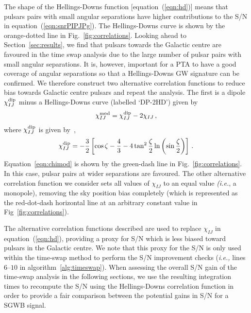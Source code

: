 \documentclass[fleqn,usenatbib]{mnras}
\newcommand{\chiIJhd}{\chi_{IJ}}
\newcommand{\chiIJdip}{\chi_{IJ}^{\rm dip}}
\begin{document}
The shape of the Hellings-Downs function [equation~(\ref{eqn:hd})] means that pulsars pairs with small angular separations have higher contributions to the S/N in equation~(\ref{eqn:snrPIPJPg}). 
The Hellings-Downs curve is shown by the orange-dotted line in Fig.~\ref{fig:correlations}.
Looking ahead to Section~\ref{sec:results}, we find that pulsars towards the Galactic centre are favoured in the time swap analysis due to the large number of pulsar pairs with small angular separations.
It is, however, important for a PTA to have a good coverage of angular separations so that a Hellings-Downs GW signature can be confirmed. 
We therefore construct two alternative correlation functions to reduce bias towards Galactic centre pulsars and repeat the analysis.
The first is a dipole $\chiIJdip$ minus a Hellings-Downs curve (labelled `DP-2HD') given by
\begin{equation}
\chi_{IJ}^{\rm mod} = \chiIJdip - 2 \chiIJhd\,,
\label{eqn:chimod}
\end{equation}
where $\chiIJdip$ is given by~\citep{AnholmEtAl:2009},
\begin{equation}
\chiIJdip = -\frac{3}{2}
            \left[ \cos \zeta - \frac{4}{3} - 4 \tan^2 \frac{\zeta}{2} 
                   \ln \left( \sin \frac{\zeta}{2} \right) \right]\,.
\label{eqn:dip}
\end{equation}
Equation~\ref{eqn:chimod} is shown by the green-dash line in Fig.~\ref{fig:correlations}. 
In this case, pulsar pairs at wider separations are favoured.
The other alternative correlation function we consider sets all values of $\chiIJhd$ to an equal value \emph{(i.e.}, a monopole), removing the sky position bias completely (which is represented as the red-dot-dash horizontal line at an arbitrary constant value in Fig~\ref{fig:correlations}). 

The alternative correlation functions described are used to replace $\chi_{IJ}$ in equation~(\ref{eqn:hd}), providing a proxy for S/N which is less biased toward pulsars in the Galactic centre. 
We note that this proxy for the S/N is only used within the time-swap method to perform the S/N improvement checks (\emph{i.e.,} lines $6$--$10$ in algorithm~\ref{alg:timeswap}). 
When assessing the overall S/N gain of the time-swap analysis in the following sections, we use the resulting integration times to recompute the S/N using the Hellings-Downs correlation function in order to provide a fair comparison between the potential gains in S/N for a SGWB signal.
\end{document}
